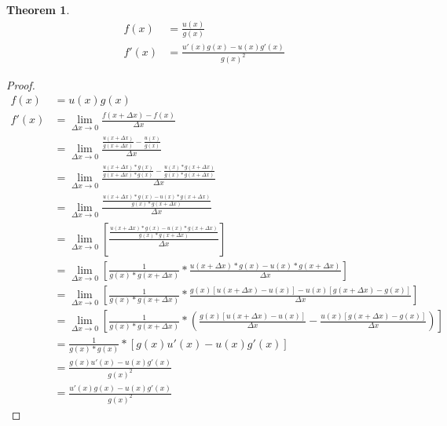\documentclass{article}
\newtheorem{theorem}{Theorem}[section]
\theoremstyle{definition}
\begin{document}
\begin{theorem}
	\begin{align*}
	f(x)&=\frac {u(x)} {g(x)} \\
	f'(x)&=\frac{u'(x)g(x)-u(x)g'(x)}{g(x)^2}
	\end{align*}
\end{theorem}
\begin{proof}
	\begin{align*}
	f(x) &= u(x)g(x) \\
	f'(x) &= \lim_{\Delta x \to 0} {\frac {f(x+\Delta x) - f(x)} {\Delta x}} \\
	&= \lim_{\Delta x \to 0} {\frac {\frac {u(x+\Delta x)} {g(x+\Delta x)} - \frac {u(x)}{g(x)}} {\Delta x}} \\
	&= \lim_{\Delta x \to 0} {\frac {\frac {u(x+\Delta x)*g(x)} {g(x+\Delta x)*g(x)} - \frac {u(x)*g(x+\Delta x)}{g(x)*g(x+\Delta x)}} {\Delta x}} \\	
	&= \lim_{\Delta x \to 0} {\frac {\frac {u(x+\Delta x)*g(x) - u(x)*g(x+\Delta x)} {g(x)*g(x+\Delta x)}} {\Delta x}} \\
	&= \lim_{\Delta x \to 0} \left[ {\frac {\frac {u(x+\Delta x)*g(x) - u(x)*g(x+\Delta x)} {g(x)*g(x+\Delta x)}} {\Delta x}} \right] \\
	&= \lim_{\Delta x \to 0} \left[ {\frac {1} {g(x)*g(x+\Delta x)} * \frac {u(x+\Delta x)*g(x) - u(x)*g(x+\Delta x)} {\Delta x}} \right] \\
	&= \lim_{\Delta x \to 0} \left[ {\frac {1} {g(x)*g(x+\Delta x)} * \frac {g(x)[u(x+\Delta x)-u(x)] - u(x)[g(x+\Delta x) - g(x)]} {\Delta x}} \right] \\
	&= \lim_{\Delta x \to 0} \left[ {\frac {1} {g(x)*g(x+\Delta x)} * \left( \frac {g(x)[u(x+\Delta x)-u(x)]} {\Delta x} - \frac {u(x)[g(x+\Delta x) - g(x)]} {\Delta x} \right)} \right]\\
	&= \frac {1} {g(x)*g(x)} * \left[ g(x)u'(x) - u(x)g'(x) \right]\\
	&= \frac {g(x)u'(x) - u(x)g'(x)} {g(x)^2}\\
	&= \frac {u'(x)g(x) - u(x)g'(x)} {g(x)^2}
	\end{align*}
\end{proof}
\end{document}
